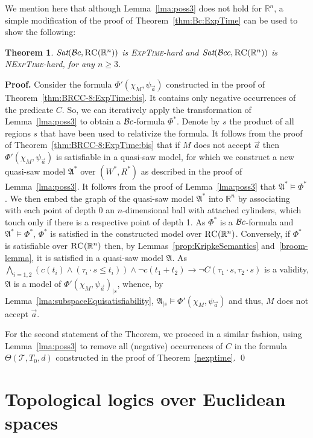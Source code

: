 \documentclass{LMCS}
\renewenvironment{proof}{\par\noindent\textbf{Proof.}}{\mbox{}\qed\par\medskip}
\theoremstyle{plain}
\newtheorem{theorem}[thm]{Theorem}
\newcommand{\fA}{\mathfrak{A}}\newcommand{\fB}{\mathfrak{B}}\newcommand{\fM}{\mathfrak{M}}\newcommand{\cK}{\mathcal{K}}\newcommand{\R}{\mathbb{R}}\newcommand{\cR}{\mathcal{R}}\newcommand{\cL}{\mathcal{L}}\newcommand{\cLc}{\mathcal{L}c}\newcommand{\cLcc}{\mathcal{L}cc}
\newcommand{\Sat}{\textit{Sat}}
\newcommand{\ExpTime}{\textsc{ExpTime}}
\newcommand{\NExpTime}{\textsc{NExpTime}}
\begin{document}
We mention here that although Lemma~\ref{lma:poss3} does not hold for
$\R^n$, a simple modification of the proof of
Theorem~\ref{thm:Bc:ExpTime} can be used to show the following:
\begin{theorem}\label{thm:Bc:ExpTime:R}
$\Sat(\cBc,\RegC(\R^n))$ is
\ExpTime{}-hard and
$\Sat(\cBcc,\RegC(\R^n))$ is
\NExpTime{}-hard, for any $n \geq 3$.
\end{theorem}
\begin{proof}
Consider the formula $\Phi'(\chi_M,\psi_{\vec{a}})$ constructed in the
proof of Theorem~\ref{thm:BRCC-8:ExpTime:bis}. It contains only
negative occurrences of the predicate $C$. So, we can iteratively apply the
transformation of Lemma~\ref{lma:poss3} to obtain a $\mathcal{B}c$-formula
$\Phi^*$. Denote by $s$ the product of all regions $s$ that have been
used to relativize the formula. It follows from the proof of
Theorem~\ref{thm:BRCC-8:ExpTime:bis} that if $M$ does not accept
$\vec{a}$ then $\Phi'(\chi_M,\psi_{\vec{a}})$ is satisfiable in a
quasi-saw model, for which we construct a new quasi-saw model
$\mathfrak{A}^*$ over $(W^*,R^*)$ as described in the proof of
Lemma~\ref{lma:poss3}. It follows from the proof of
Lemma~\ref{lma:poss3} that $\mathfrak{A}^*\models\Phi^*$. We then
embed the graph of the quasi-saw model $\mathfrak{A}^*$ into $\R^n$ by
associating with each point of depth 0 an $n$-dimensional ball with
attached cylinders, which touch only if there is a respective point of
depth 1. As $\Phi^*$ is a $\mathcal{B}c$-formula and
$\mathfrak{A}^*\models\Phi^*$, $\Phi^*$ is satisfied in the
constructed model over $\RegC(\R^n)$. Conversely, if $\Phi^*$ is
satisfiable over $\RegC(\R^n)$ then, by
Lemmas~\ref{prop:KripkeSemantics} and~\ref{broom-lemma}, it is
satisfied in a quasi-saw model $\mathfrak{A}$. As $\bigwedge_{i = 1,2}
\left(c(t_i) \land (\tau_i \cdot s \leq t_i) \right) \wedge \neg c(t_1
+ t_2) \rightarrow \neg C(\tau_1 \cdot s, \tau_2 \cdot s)$ is a
validity, $\fA$ is a model of $\Phi'(\chi_M,\psi_{\vec{a}})_{\mid s}$,
whence, by Lemma~\ref{lma:subspaceEquisatisfiability}, $\fA_{\mid s}
\models \Phi'(\chi_M,\psi_{\vec{a}})$ and thus, $M$ does not accept
$\vec{a}$.


For the second statement of the Theorem, we proceed in a similar
fashion, using Lemma~\ref{lma:poss3} to remove all (negative)
occurrences of $C$ in the formula $\Theta(\mathcal{T},T_0,d)$
constructed in the proof of Theorem~\ref{nexptime}.
\end{proof}




\section{Topological logics over Euclidean spaces}
\label{sec:Euclidean}
\end{document}
